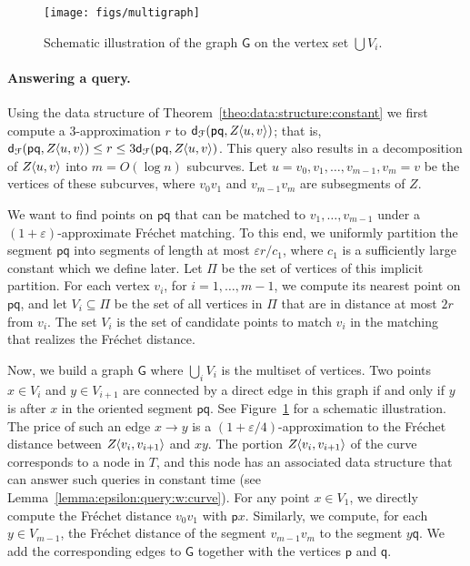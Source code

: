\documentclass[12pt]{article}
\newcommand{\thmref}[1]{Theorem~\ref{theo:#1}}
\newcommand{\lemref}[1]{Lemma~\ref{lemma:#1}}
\newcommand{\figlab}[1]{\label{fig:#1}}
\newcommand{\figref}[1]{Figure~\ref{fig:#1}}
\newcommand{\ts}{\hspace{0.6pt}}
\newcommand{\Frechet}{Fr\'{e}c{h}e{}t\xspace}\providecommand{\Arr}{\mathop{\mathrm{\EuScript{A}}}}
\newcommand{\distFr}[2]{\mathsf{d}_{\EuScript{F}}\pth{#1, #2}}
\newcommand{\pnt}{\mathsf{p}}
\newcommand{\pntA}{\mathsf{q}}
\newcommand{\cZ}{{Z}}
\newcommand{\Graph}{\mathsf{G}}
\providecommand{\pth}[2][\!]{#1\left({#2}\right)}
\newcommand{\constA}{c_1}
\providecommand{\eps}{{\varepsilon}}\renewcommand{\Re}{{\rm I\!\hspace{-0.025em} R}}
\newcommand{\SC}[3]{{#1}\!\!\ts\ts \left\langle  #2, #3 \right\rangle}
\newcommand{\Tree}{T}
\newcommand{\dEdge}[2]{{#1 \rightarrow #2}}
\numberwithin{figure}{section}
\numberwithin{equation}{section}
\newcommand{\matching}{matching\xspace}
\begin{document}
\begin{figure}\centering
    \texttt{[image: figs/multigraph]}
    \caption{Schematic illustration of the graph $\Graph$ on the
       vertex set $\bigcup V_i$.}
    \figlab{vi:graph}
\end{figure}


\paragraph{Answering a query.}
Using the data structure of \thmref{data:structure:constant} we first
compute a $3$-approximation $r$ to $\distFr{\pnt \pntA}
{\SC{\cZ}{u}{v}}$; that is, $\distFr{\pnt \pntA} {\SC{\cZ}{u}{v}} \leq
r \leq 3\distFr{\pnt \pntA} {\SC{\cZ}{u}{v}}$.  This query also
results in a decomposition of $\SC{\cZ}{u}{v}$ into $m = O( \log n)$
subcurves. Let $u = v_0, v_1, \ldots, v_{m-1}, v_m =v$ be the vertices
of these subcurves, where $v_0v_1$ and $v_{m-1}v_m$ are subsegments of
$\cZ$.

We want to find points on $\pnt \pntA$ that can be matched to
$v_1,\dots,v_{m-1}$ under a $(1+\eps)$-approximate \Frechet matching.
To this end, we uniformly partition the segment $\pnt \pntA$ into
segments of length at most {$\eps r / \constA$, where $\constA$ is a
   sufficiently large constant which we define later.}  Let $\Pi$ be
the set of vertices of this implicit partition.  For each vertex
$v_i$, for $i=1, \ldots, m-1$, we compute its nearest point on $\pnt
\pntA$, and let $V_i \subseteq \Pi$ be the set of all vertices in
$\Pi$ that are in distance at most $2r$ from $v_i$.  The set $V_i$ is
the set of candidate points to match $v_i$ in the \matching{} that
realizes the \Frechet distance.

Now, we build a graph $\Graph$ where $\bigcup_i V_i$ is the multiset
of vertices. Two points $x \in V_i$ and $y \in V_{i+1}$ are connected
by a direct edge in this graph if and only if $y$ is after $x$ in the
oriented segment $\pnt \pntA$. See \figref{vi:graph} for a schematic
illustration. The price of such an edge $\dEdge{x}{y}$ is a
$(1+\eps/4)$-approximation to the \Frechet distance between
$\SC{\cZ}{v_i}{v_{i+1}}$ and $xy$.  The portion
$\SC{\cZ}{v_i}{v_{i+1}}$ of the curve corresponds to a node in
$\Tree$, and this node has an associated data structure that can
answer such queries in constant time (see
\lemref{epsilon:query:w:curve}).  For any point $x \in V_1$, we
directly compute the \Frechet distance $v_0 v_1$ with $\pnt
x$. Similarly, we compute, for each $y \in V_{m-1}$, the \Frechet
distance of the segment $v_{m-1} v_m$ to the segment $y \pntA$. We add
the corresponding edges to $\Graph$ together with the vertices $\pnt$
and $\pntA$.
\end{document}
